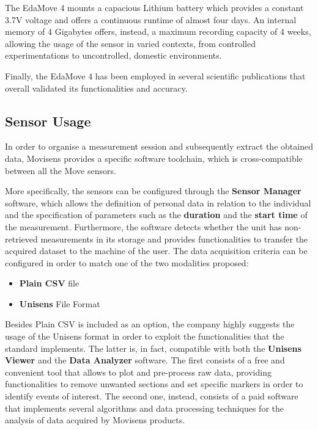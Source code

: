 The EdaMove 4 mounts a capacious Lithium battery which provides a constant 3.7V voltage and offers a continuous runtime of almost four days. An internal memory of 4 Gigabytes offers, instead, a maximum recording capacity of 4 weeks, allowing the usage of the sensor in varied contexts, from controlled experimentations to uncontrolled, domestic environments. 

Finally, the EdaMove 4 has been employed in several scientific publications that overall validated its functionalities and accuracy.

\subsection{Sensor Usage}\label{subsec:edamove4-usage}

In order to organise a measurement session and subsequently extract the obtained data, Movisens provides a specific software toolchain, which is cross-compatible between all the Move sensors. 

More specifically, the sensors can be configured through the \textbf{Sensor Manager} software, which allows the definition of personal data in relation to the individual and the specification of parameters such as the \textbf{duration} and the \textbf{start time} of the measurement. Furthermore, the software detects whether the unit has non-retrieved measurements in its storage and provides functionalities to transfer the acquired dataset to the machine of the user. The data acquisition criteria can be configured in order to match one of the two modalities proposed:

\begin{itemize}
    \item \textbf{Plain CSV} file
    \item \textbf{Unisens} File Format 
\end{itemize}

Besides Plain CSV is included as an option, the company highly suggests the usage of the Unisens format in order to exploit the functionalities that the standard implements. The latter is, in fact, compatible with both the \textbf{Unisens Viewer} and the \textbf{Data Analyzer} software. The first consists of a free and convenient tool that allows to plot and pre-process raw data, providing functionalities to remove unwanted sections and set specific markers in order to identify events of interest. The second one, instead, consists of a paid software that implements several algorithms and data processing techniques for the analysis of data acquired by Movisens products.

